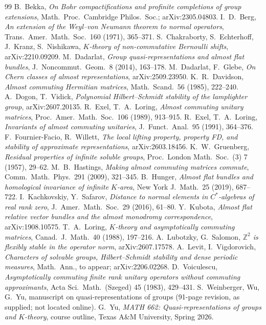 \documentclass[11pt]{amsart}
\theoremstyle{definition}
\theoremstyle{remark}
\newcommand{\Z}{\mathbb Z}
\begin{document}
\begin{thebibliography}{99}
 B.~Bekka, \emph{On Bohr compactifications and profinite completions of group extensions}, Math.\ Proc.\ Cambridge Philos.\ Soc.; arXiv:2305.04803.
 I.~D.~Berg, \emph{An extension of the Weyl--von Neumann theorem to normal operators}, Trans.\ Amer.\ Math.\ Soc.\ 160 (1971), 365--371.
 S.~Chakraborty, S.~Echterhoff, J.~Kranz, S.~Nishikawa, \emph{$K$-theory of non-commutative Bernoulli shifts}, arXiv:2210.09209.
 M.~Dadarlat, \emph{Group quasi-representations and almost flat bundles}, J.\ Noncommut.\ Geom.\ 8 (2014), 163--178.
 M.~Dadarlat, F.~Glebe, \emph{On Chern classes of almost representations}, arXiv:2509.23950.
 K.~R.~Davidson, \emph{Almost commuting Hermitian matrices}, Math.\ Scand.\ 56 (1985), 222--240.
 A.~Dogon, T.~Vidick, \emph{Polynomial Hilbert--Schmidt stability of the lamplighter group}, arXiv:2607.20135.
 R.~Exel, T.~A.~Loring, \emph{Almost commuting unitary matrices}, Proc.\ Amer.\ Math.\ Soc.\ 106 (1989), 913--915.
 R.~Exel, T.~A.~Loring, \emph{Invariants of almost commuting unitaries}, J.\ Funct.\ Anal.\ 95 (1991), 364--376.
 F.~Fournier-Facio, R.~Willett, \emph{The local lifting property, property FD, and stability of approximate representations}, arXiv:2603.18456.
 K.~W.~Gruenberg, \emph{Residual properties of infinite soluble groups}, Proc.\ London Math.\ Soc.\ (3) 7 (1957), 29--62.
 M.~B.~Hastings, \emph{Making almost commuting matrices commute}, Comm.\ Math.\ Phys.\ 291 (2009), 321--345.
 B.~Hunger, \emph{Almost flat bundles and homological invariance of infinite $K$-area}, New York J.\ Math.\ 25 (2019), 687--722.
 I.~Kachkovskiy, Y.~Safarov, \emph{Distance to normal elements in $C^*$-algebras of real rank zero}, J.\ Amer.\ Math.\ Soc.\ 29 (2016), 61--80.
 Y.~Kubota, \emph{Almost flat relative vector bundles and the almost monodromy correspondence}, arXiv:1908.10575.
 T.~A.~Loring, \emph{$K$-theory and asymptotically commuting matrices}, Canad.\ J.\ Math.\ 40 (1988), 197--216.
 A.~Lubotzky, G.~Salomon, \emph{$\Z^2$ is flexibly stable in the operator norm}, arXiv:2607.17578.
 A.~Levit, I.~Vigdorovich, \emph{Characters of solvable groups, Hilbert--Schmidt stability and dense periodic measures}, Math.\ Ann., to appear; arXiv:2206.02268.
 D.~Voiculescu, \emph{Asymptotically commuting finite rank unitary operators without commuting approximants}, Acta Sci.\ Math.\ (Szeged) 45 (1983), 429--431.
 S.~Weinberger, Wu, G.~Yu, manuscript on quasi-representations of groups (91-page revision, as supplied; not located online).
 G.~Yu, \emph{MATH 662: Quasi-representations of groups and $K$-theory}, course outline, Texas A\&M University, Spring 2026.
\end{thebibliography}
\end{document}
